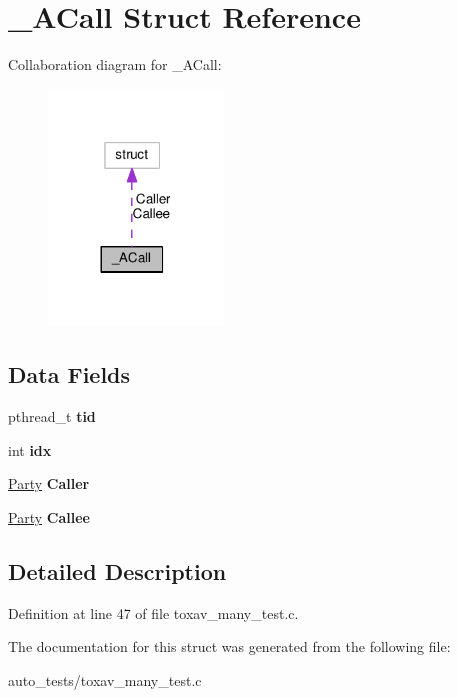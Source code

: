 \hypertarget{struct___a_call}{\section{\+\_\+\+A\+Call Struct Reference}
\label{struct___a_call}
}


Collaboration diagram for \+\_\+\+A\+Call\+:
\nopagebreak
\begin{figure}[H]
\begin{center}
\leavevmode
\includegraphics[width=132pt]{struct___a_call__coll__graph}
\end{center}
\end{figure}
\subsection*{Data Fields}
\begin{DoxyCompactItemize}
\item 
\hypertarget{struct___a_call_a3a5ba243b3ab4b6093afb178de0f9509}{pthread\+\_\+t {\bfseries tid}}\label{struct___a_call_a3a5ba243b3ab4b6093afb178de0f9509}

\item 
\hypertarget{struct___a_call_ae40354a1051342eb5a9db005715dcfa9}{int {\bfseries idx}}\label{struct___a_call_ae40354a1051342eb5a9db005715dcfa9}

\item 
\hypertarget{struct___a_call_a51f82344f432ea82fc1a993d1f9cb018}{\hyperlink{struct___party}{Party} {\bfseries Caller}}\label{struct___a_call_a51f82344f432ea82fc1a993d1f9cb018}

\item 
\hypertarget{struct___a_call_ac9f376aa53c5e8c50a3ebd11c377f0dd}{\hyperlink{struct___party}{Party} {\bfseries Callee}}\label{struct___a_call_ac9f376aa53c5e8c50a3ebd11c377f0dd}

\end{DoxyCompactItemize}


\subsection{Detailed Description}


Definition at line 47 of file toxav\+\_\+many\+\_\+test.\+c.



The documentation for this struct was generated from the following file\+:\begin{DoxyCompactItemize}
\item 
auto\+\_\+tests/toxav\+\_\+many\+\_\+test.\+c\end{DoxyCompactItemize}
